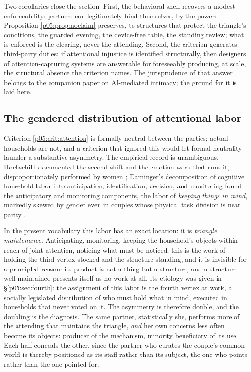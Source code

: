 Two corollaries close the section. First, the behavioral shell recovers a modest enforceability: partners can legitimately bind themselves, by the powers Proposition \ref{p05:prop:noclaim} preserves, to structures that protect the triangle's conditions, the guarded evening, the device-free table, the standing review; what is enforced is the clearing, never the attending. Second, the criterion generates third-party duties: if attentional injustice is identified structurally, then designers of attention-capturing systems are answerable for foreseeably producing, at scale, the structural absence the criterion names. The jurisprudence of that answer belongs to the companion paper on AI-mediated intimacy; the ground for it is laid here.

\subsection{The gendered distribution of attentional labor}
\label{p05:sec:gender}

Criterion \ref{p05:crit:attention} is formally neutral between the parties; actual households are not, and a criterion that ignored this would let formal neutrality launder a substantive asymmetry. The empirical record is unambiguous. Hochschild documented the second shift and the emotion work that runs it, disproportionately performed by women \parencite{hochschild1989, hochschild1983}; Daminger's decomposition of cognitive household labor into anticipation, identification, decision, and monitoring found the anticipatory and monitoring components, the labor of \emph{keeping things in mind}, markedly skewed by gender even in couples whose physical task division is near parity \parencite{daminger2019}.

In the present vocabulary this labor has an exact location: it is \emph{triangle maintenance}. Anticipating, monitoring, keeping the household's objects within reach of joint attention, noticing what must be noticed: this is the work of holding the third vertex stocked and the structure standing, and it is invisible for a principled reason: its product is not a thing but a structure, and a structure well maintained presents itself as no work at all. Its etiology was given in §\ref{p05:sec:fourth}: the assignment of this labor is the fourth vertex at work, a socially legislated distribution of who must hold what in mind, executed in households that never voted on it. The asymmetry is therefore double, and the doubling is the diagnosis. The same partner, statistically she, performs more of the attending that maintains the triangle, \emph{and} her own concerns less often become its objects: producer of the mechanism, minority beneficiary of its use. Each half conceals the other, since the partner who curates the couple's common world is thereby positioned as its staff rather than its subject, the one who points rather than the one pointed for.

